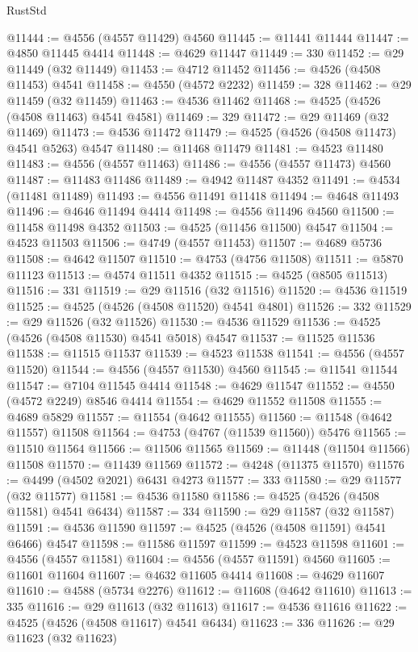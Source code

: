 \begin{lexlean}{RustStd}
\begin{coremodule}
{\begin{coremodule}
{{{{{{{{{{{{{{{{{{{{{{{{{{{{{{{{{{{{{{{{{{{{{{{{{{{{{{{@11444 := @4556 (@4557 @11429) @4560
@11445 := @11441 @11444
@11447 := @4850 @11445 @4414
@11448 := @4629 @11447
@11449 := 330
@11452 := @29 @11449 (@32 @11449)
@11453 := @4712 @11452
@11456 := @4526 (@4508 @11453) @4541
@11458 := @4550 (@4572 @2232)
@11459 := 328
@11462 := @29 @11459 (@32 @11459)
@11463 := @4536 @11462
@11468 := @4525 (@4526 (@4508 @11463) @4541 @4581)
@11469 := 329
@11472 := @29 @11469 (@32 @11469)
@11473 := @4536 @11472
@11479 := @4525 (@4526 (@4508 @11473) @4541 @5263) @4547
@11480 := @11468 @11479
@11481 := @4523 @11480
@11483 := @4556 (@4557 @11463)
@11486 := @4556 (@4557 @11473) @4560
@11487 := @11483 @11486
@11489 := @4942 @11487 @4352
@11491 := @4534 (@11481 @11489)
@11493 := @4556 @11491 @11418
@11494 := @4648 @11493
@11496 := @4646 @11494 @4414
@11498 := @4556 @11496 @4560
@11500 := @11458 @11498 @4352
@11503 := @4525 (@11456 @11500) @4547
@11504 := @4523 @11503
@11506 := @4749 (@4557 @11453)
@11507 := @4689 @5736
@11508 := @4642 @11507
@11510 := @4753 (@4756 @11508)
@11511 := @5870 @11123
@11513 := @4574 @11511 @4352
@11515 := @4525 (@8505 @11513)
@11516 := 331
@11519 := @29 @11516 (@32 @11516)
@11520 := @4536 @11519
@11525 := @4525 (@4526 (@4508 @11520) @4541 @4801)
@11526 := 332
@11529 := @29 @11526 (@32 @11526)
@11530 := @4536 @11529
@11536 := @4525 (@4526 (@4508 @11530) @4541 @5018) @4547
@11537 := @11525 @11536
@11538 := @11515 @11537
@11539 := @4523 @11538
@11541 := @4556 (@4557 @11520)
@11544 := @4556 (@4557 @11530) @4560
@11545 := @11541 @11544
@11547 := @7104 @11545 @4414
@11548 := @4629 @11547
@11552 := @4550 (@4572 @2249) @8546 @4414
@11554 := @4629 @11552 @11508
@11555 := @4689 @5829
@11557 := @11554 (@4642 @11555)
@11560 := @11548 (@4642 @11557) @11508
@11564 := @4753 (@4767 (@11539 @11560)) @5476
@11565 := @11510 @11564
@11566 := @11506 @11565
@11569 := @11448 (@11504 @11566) @11508
@11570 := @11439 @11569
@11572 := @4248 (@11375 @11570)
@11576 := @4499 (@4502 @2021) @6431 @4273
@11577 := 333
@11580 := @29 @11577 (@32 @11577)
@11581 := @4536 @11580
@11586 := @4525 (@4526 (@4508 @11581) @4541 @6434)
@11587 := 334
@11590 := @29 @11587 (@32 @11587)
@11591 := @4536 @11590
@11597 := @4525 (@4526 (@4508 @11591) @4541 @6466) @4547
@11598 := @11586 @11597
@11599 := @4523 @11598
@11601 := @4556 (@4557 @11581)
@11604 := @4556 (@4557 @11591) @4560
@11605 := @11601 @11604
@11607 := @4632 @11605 @4414
@11608 := @4629 @11607
@11610 := @4588 (@5734 @2276)
@11612 := @11608 (@4642 @11610)
@11613 := 335
@11616 := @29 @11613 (@32 @11613)
@11617 := @4536 @11616
@11622 := @4525 (@4526 (@4508 @11617) @4541 @6434)
@11623 := 336
@11626 := @29 @11623 (@32 @11623)
}}}}}}}}}}}}}}}}}}}}}}}}}}}}}}}}}}}}}}}}}}}}}}}}}}}}}}}
\end{coremodule}}
\end{coremodule}
\end{lexlean}
